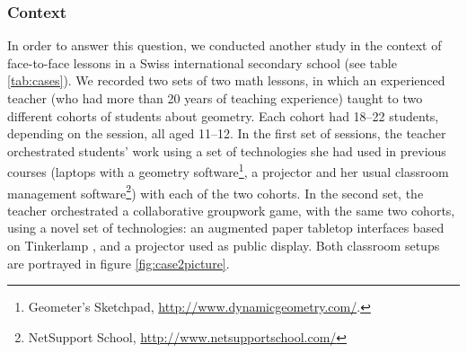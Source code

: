 \documentclass[10pt,journal,compsoc]{IEEEtran}
\begin{document}

\subsubsection{Context}

In order to answer this question, we conducted another study in the context of face-to-face lessons in a Swiss international secondary school (see table \ref{tab:cases}). We recorded two sets of two math lessons, in which an experienced teacher (who had more than 20 years of teaching experience) taught to two different cohorts of students about geometry. Each cohort had 18--22 students, depending on the session, all aged 11--12. In the first set of sessions, the teacher orchestrated students' work using a set of technologies she had used in previous courses (laptops with a geometry software\footnote{Geometer's Sketchpad, \href{http://www.dynamicgeometry.com/}{http://www.dynamicgeometry.com/}.}, a projector and her usual classroom management software\footnote{NetSupport School, \href{http://www.netsupportschool.com/}{http://www.netsupportschool.com/}}) with each of the two cohorts. In the second set, the teacher orchestrated a collaborative groupwork game, with the same two cohorts, using a novel set of technologies: an augmented paper tabletop interfaces based on Tinkerlamp \cite{do2012tinkerlamp}, and a projector used as public display. Both classroom setups are portrayed in figure \ref{fig:case2picture}.


\end{document}
